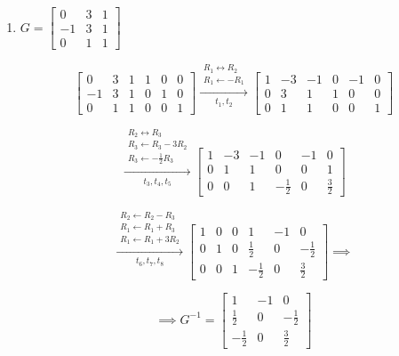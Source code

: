 \begin{enumerate}[label=\alph*)]
\item
$G=
\begin{bmatrix}
    0 & 3 & 1\\
    -1 & 3 & 1\\
    0 & 1 & 1
\end{bmatrix}
$

\begin{answer}
    $$
    \left[
    \begin{array}{ccc|ccc}
         0 & 3 & 1 & 1 & 0 & 0\\
        -1 & 3 & 1 & 0 & 1 & 0\\
         0 & 1 & 1 & 0 & 0 & 1
    \end{array}
    \right]
    \xrightarrow[t_1,t_2]{
        \substack{
            R_1\leftrightarrow R_2\\
            R_1\leftarrow-R_1
        }
    }
    \left[
    \begin{array}{ccc|ccc}
        1 & -3 & -1 & 0 & -1 & 0\\
        0 & 3 & 1 & 1 & 0 & 0\\
        0 & 1 & 1 & 0 & 0 & 1
    \end{array}
    \right]
    $$

    $$
    \xrightarrow[t_3,t_4,t_5]{
        \substack{
            R_2\leftrightarrow R_3\\
            R_3\leftarrow R_3-3R_2\\
            R_3\leftarrow-\frac12R_3
        }
    }
    \left[
    \begin{array}{ccc|ccc}
        1 & -3 & -1 & 0 & -1 & 0\\
        0 & 1 & 1 & 0 & 0 & 1\\
        0 & 0 & 1 & -\frac12 & 0 & \frac32
    \end{array}
    \right]
    $$

    $$
    \xrightarrow[t_6,t_7,t_8]{
        \substack{
            R_2\leftarrow R_2-R_3\\
            R_1\leftarrow R_1+R_3\\
            R_1\leftarrow R_1+3R_2
        }
    }
    \left[
    \begin{array}{ccc|ccc}
        1 & 0 & 0 & 1 & -1 & 0\\
        0 & 1 & 0 & \frac12 & 0 & -\frac12\\
        0 & 0 & 1 & -\frac12 & 0 & \frac32
    \end{array}
    \right]
    \implies
    $$

    $$
    \implies
    \boxed{
    G^{-1}=
    \begin{bmatrix}
        1 & -1 & 0\\
        \frac12 & 0 & -\frac12\\
        -\frac12 & 0 & \frac32
    \end{bmatrix}
    }
    $$
\end{answer}


\end{enumerate}
